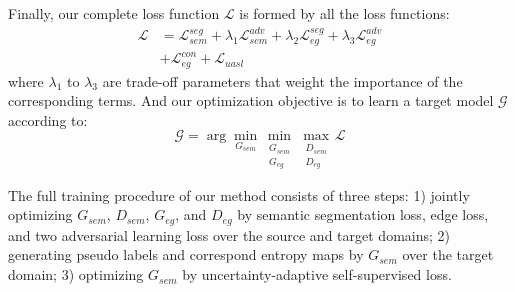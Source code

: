 \documentclass[sigconf]{acmart}
\begin{document}
\par Finally, our complete loss function $\mathcal{L}$ is formed by all the loss functions: 
\begin{equation}
\begin{aligned} 
\mathcal{L} &=\mathcal{L}_{s e m}^{s e g}+\lambda_{1} \mathcal{L}_{s e m}^{a d v}+\lambda_{2} \mathcal{L}_{e g}^{s e g} +\lambda_{3} \mathcal{L}_{e g}^{a d v}\\ &+\mathcal{L}_{e g}^{c o n}+\mathcal{L}_{u a s l} \end{aligned}    
\label{eq:6}
\end{equation}
where $\lambda_{1}$ to $\lambda_{3}$ are trade-off parameters that weight the importance of the corresponding terms. And our optimization objective is to learn a target model $\mathcal{G}$ according to:
\begin{equation}
    \mathcal{G}=\mathop{\arg}\mathop{\min}_{G_{sem}} \mathop{\min}_{\substack{G_{sem}\\G_{eg}}} \mathop{\max}_{\substack{D_{sem}\\D_{eg}}} \mathcal{L}
\label{eq:7}
\end{equation}
\par The full training procedure of our method consists of three steps: 1) jointly optimizing $G_{sem}$, $D_{sem}$, $G_{eg}$, and $D_{eg}$ by semantic segmentation loss, edge loss, and two adversarial learning loss over the source and target domains; 2) generating pseudo labels and correspond entropy maps by $G_{sem}$ over the target domain; 3) optimizing $G_{sem}$ by uncertainty-adaptive self-supervised loss. 
\end{document}
